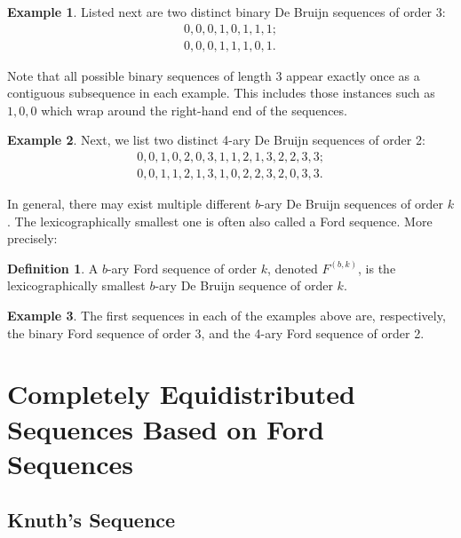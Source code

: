 \documentclass[11pt,a4paper]{tesis}
\theoremstyle{plain}
\theoremstyle{definition}
\newtheorem*{definition*}{Definition}
\newtheorem*{exmp*}{Example}
\begin{document}
\begin{exmp*}
  Listed next are two distinct binary De Bruijn sequences of order 3:
  \begin{equation*}
    \begin{aligned}
      0, 0, 0, 1, 0, 1, 1, 1; \\
      0, 0, 0, 1, 1, 1, 0, 1.
    \end{aligned}
  \end{equation*}
\end{exmp*}

Note that all possible binary sequences of length 3 appear exactly once as a contiguous subsequence in each example. This includes those instances such as $1, 0, 0$ which wrap around the right-hand end of the sequences.

\begin{exmp*}
  Next, we list two distinct 4-ary De Bruijn sequences of order 2:
  \begin{equation*}
    \begin{aligned}
      0, 0, 1, 0, 2, 0, 3, 1, 1, 2, 1, 3, 2, 2, 3, 3; \\
      0, 0, 1, 1, 2, 1, 3, 1, 0, 2, 2, 3, 2, 0, 3, 3.
    \end{aligned}
  \end{equation*}  
\end{exmp*}

In general, there may exist multiple different $b$-ary De Bruijn sequences of order $k$. The lexicographically smallest one is often also called a Ford sequence. More precisely:

\begin{definition*}
  A $b$-ary Ford sequence of order $k$, denoted $F^{(b, k)}$, is the lexicographically smallest $b$-ary De Bruijn sequence of order $k$.
\end{definition*}

\begin{exmp*}
  The first sequences in each of the examples above are, respectively, the binary Ford sequence of order 3, and the 4-ary Ford sequence of order 2.
\end{exmp*}

\chapter{Completely Equidistributed Sequences Based on Ford Sequences}\label{chapter:cesbofs}

\section{Knuth's Sequence}
\end{document}
